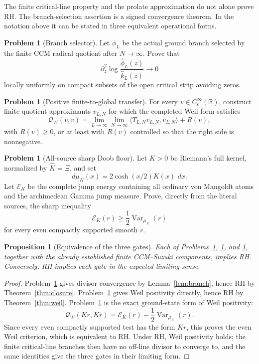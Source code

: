 \documentclass[11pt]{amsart}
\newtheorem{proposition}[theorem]{Proposition}
\theoremstyle{definition}
\newtheorem{problem}[theorem]{Problem}
\theoremstyle{remark}
\newcommand{\R}{\mathbb R}
\newcommand{\dd}{\,d}
\newcommand{\QW}{\mathcal Q_W}
\newcommand{\XiR}{\Xi}
\DeclareMathOperator{\Var}{Var}
\begin{document}
The finite critical-line property and the prolate approximation do not
alone prove RH.  The branch-selection assertion is a signed convergence
theorem.  In
the notation above it can be stated in three equivalent operational forms.

\begin{problem}[Branch selector]
\label{prob:branch}
Let \(\phi_L\) be the actual ground branch selected by the finite CCM
radical quotient after \(N\to\infty\).  Prove that
\[
 \partial_z^2\log
 \frac{\widehat\phi_L(z)}{\widehat k_L(z)}
 \longrightarrow0
\tag{7.1}
\]
locally uniformly on compact subsets of the open critical strip avoiding
zeros.
\end{problem}

\begin{problem}[Positive finite-to-global transfer]
\label{prob:transfer}
For every \(v\in C_c^\infty(\R)\), construct finite quotient approximants
\(v_{L,N}\) for which the completed Weil form satisfies
\[
 \QW(v,v)
 =
 \lim_{L\to\infty}\lim_{N\to\infty}
 \langle T_{L,N}v_{L,N},v_{L,N}\rangle
 +
 R(v),
\tag{7.2}
\]
with \(R(v)\ge0\), or at least with \(R(v)\) controlled so that the right
side is nonnegative.
\end{problem}

\begin{problem}[All-source sharp Doob floor]
\label{prob:doob}
Let \(K>0\) be Riemann's full kernel, normalized by
\(\widehat K=\XiR\), and set
\[
 d\mu_K(x)=2\cosh(x/2)K(x)\,\dd x .
\tag{7.3}
\]
Let \(\mathscr E_K\) be the complete jump energy containing all ordinary
von Mangoldt atoms and the archimedean Gamma jump measure.  Prove, directly
from the literal sources, the sharp inequality
\[
 \boxed{
 \mathscr E_K(r)\ge\frac12\Var_{\mu_K}(r)}
\tag{7.4}
\]
for every even compactly supported smooth \(r\).
\end{problem}

\begin{proposition}[Equivalence of the three gates]
Each of Problems~\ref{prob:branch}, \ref{prob:transfer}, and
\ref{prob:doob}, together with the already established finite CCM--Suzuki
components, implies RH.  Conversely, RH implies each gate in the expected
limiting sense.
\end{proposition}

\begin{proof}
Problem~\ref{prob:branch} gives divisor convergence by
Lemma~\ref{lem:branch}, hence RH by Theorem~\ref{thm:closure}.
Problem~\ref{prob:transfer} gives Weil positivity directly, hence RH by
Theorem~\ref{thm:weil}.  Problem~\ref{prob:doob} is the exact ground-state
form of Weil positivity:
\[
 \QW(Kr,Kr)=\mathscr E_K(r)-\frac12\Var_{\mu_K}(r).
\tag{7.5}
\]
Since every even compactly supported test has the form \(Kr\), this proves
the even Weil criterion, which is equivalent to RH.  Under RH, Weil
positivity holds; the finite critical-line branches then have no off-line
divisor to converge to, and the same identities give the three gates in
their limiting form.
\end{proof}
\end{document}
